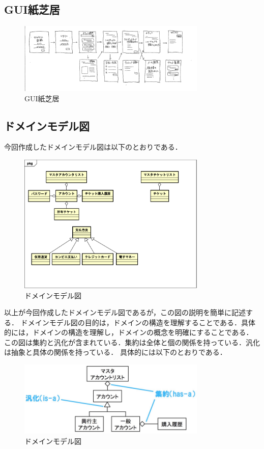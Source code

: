 \documentclass{ltjsarticle}
\begin{document}
\subsection{GUI紙芝居}
\begin{figure}
    \centering
    \includegraphics[width=0.8\textwidth]{src/GUI.png}
    \caption{GUI紙芝居}
    \label{fig:gui}
\end{figure}

\subsection{ドメインモデル図}
今回作成したドメインモデル図は以下のとおりである．
\begin{figure}[H]
    \centering
    \includegraphics[width=0.8\textwidth]{src/DomainModel.png}
    \caption{ドメインモデル図}
    \label{fig:domain_model}
\end{figure}

以上が今回作成したドメインモデル図であるが，この図の説明を簡単に記述する．
ドメインモデル図の目的は，ドメインの構造を理解することである．具体的には，ドメインの構造を理解し，ドメインの概念を明確にすることである．
この図は集約と汎化が含まれている．集約は全体と個の関係を持っている．汎化は抽象と具体の関係を持っている．
具体的には以下のとおりである．
\begin{figure}[H]
    \centering
    \includegraphics[width=0.8\textwidth]{src/ExampleDomainModel.png}
    \caption{ドメインモデル図}
    \label{fig:domain_model2}
\end{figure}
\end{document}
